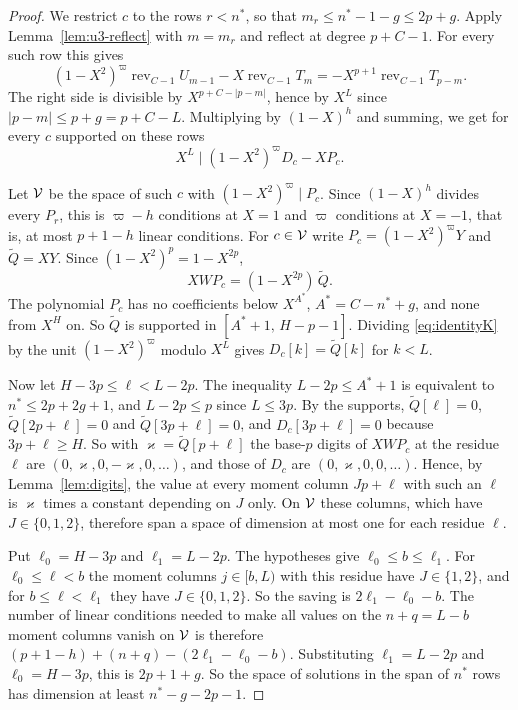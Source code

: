 \begin{proof}
We restrict $c$ to the rows $r<n^*$, so that $m_r\le n^*-1-g\le2p+g$. Apply Lemma~\ref{lem:u3-reflect} with
$m=m_r$ and reflect at degree $p+C-1$. For every such row this gives
\[
 (1-X^2)^\varpi\operatorname{rev}_{C-1}U_{m-1}-X\operatorname{rev}_{C-1}T_m=-X^{p+1}\operatorname{rev}_{C-1}T_{p-m}.
\]
The right side is divisible by $X^{p+C-|p-m|}$, hence by $X^L$ since $|p-m|\le p+g=p+C-L$. Multiplying by
$(1-X)^h$ and summing, we get for every $c$ supported on these rows
\begin{equation}\label{eq:identityK}
 X^L\mid(1-X^2)^\varpi D_c-XP_c .
\end{equation}

Let $\mathcal V$ be the space of such $c$ with $(1-X^2)^\varpi\mid P_c$. Since $(1-X)^h$ divides every $P_r$, this is
$\varpi-h$ conditions at $X=1$ and $\varpi$ conditions at $X=-1$, that is, at most $p+1-h$ linear
conditions. For $c\in\mathcal V$ write $P_c=(1-X^2)^\varpi Y$ and $\widetilde Q=XY$. Since $(1-X^2)^p=1-X^{2p}$,
\[
 XWP_c=(1-X^{2p})\,\widetilde Q .
\]
The polynomial $P_c$ has no coefficients below $X^{A^*}$, $A^*=C-n^*+g$, and none from $X^H$ on. So
$\widetilde Q$ is supported in $[A^*+1,\,H-p-1]$. Dividing \eqref{eq:identityK} by the unit $(1-X^2)^\varpi$
modulo $X^L$ gives $D_c[k]=\widetilde Q[k]$ for $k<L$.

Now let $H-3p\le\ell<L-2p$. The inequality $L-2p\le A^*+1$ is equivalent to $n^*\le2p+2g+1$, and
$L-2p\le p$ since $L\le3p$. By the supports, $\widetilde Q[\ell]=0$, $\widetilde Q[2p+\ell]=0$ and
$\widetilde Q[3p+\ell]=0$, and $D_c[3p+\ell]=0$ because $3p+\ell\ge H$. So with
$\varkappa=\widetilde Q[p+\ell]$ the base-$p$ digits of $XWP_c$ at the residue $\ell$ are
$(0,\varkappa,0,-\varkappa,0,\dots)$, and those of $D_c$ are $(0,\varkappa,0,0,\dots)$. Hence, by
Lemma~\ref{lem:digits}, the value at every moment column $Jp+\ell$ with such an $\ell$ is $\varkappa$ times a
constant depending on $J$ only. On $\mathcal V$ these columns, which have $J\in\{0,1,2\}$, therefore span a space
of dimension at most one for each residue $\ell$.

Put $\ell_0=H-3p$ and $\ell_1=L-2p$. The hypotheses give $\ell_0\le b\le\ell_1$. For $\ell_0\le\ell<b$ the
moment columns $j\in[b,L)$ with this residue have $J\in\{1,2\}$, and for $b\le\ell<\ell_1$ they have
$J\in\{0,1,2\}$. So the saving is $2\ell_1-\ell_0-b$. The number of linear conditions needed to make all
values on the $n+q=L-b$ moment columns vanish on $\mathcal V$ is therefore
$(p+1-h)+(n+q)-(2\ell_1-\ell_0-b)$. Substituting $\ell_1=L-2p$ and $\ell_0=H-3p$, this is $2p+1+g$. So the
space of solutions in the span of $n^*$ rows has dimension at least $n^*-g-2p-1$.
\end{proof}

